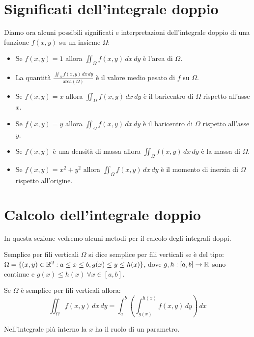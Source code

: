\section{Significati dell'integrale doppio}
Diamo ora alcuni possibili significati e interpretazioni dell'integrale doppio di una funzione $f(x,y)$ su un insieme $\Omega$:

\begin{itemize}
  \item Se $f(x,y)=1$ allora $\iint_{\Omega} f(x,y) \, dx \, dy$ è l'area di $\Omega$.
  \item La quantità $\frac{\iint_{\Omega} f(x,y) \, dx \, dy}{\text{area}(\Omega)}$ è il valore medio pesato di $f$ su $\Omega$.
  \item Se $f(x,y)=x$ allora $\iint_{\Omega} f(x,y) \, dx \, dy$ è il baricentro di $\Omega$ rispetto all'asse $x$.
  \item Se $f(x,y)=y$ allora $\iint_{\Omega} f(x,y) \, dx \, dy$ è il baricentro di $\Omega$ rispetto all'asse $y$.
  \item Se $f(x,y)$ è una densità di massa allora $\iint_{\Omega} f(x,y) \, dx \, dy$ è la massa di $\Omega$.
  \item Se $f(x,y)=x^2+y^2$ allora $\iint_{\Omega} f(x,y) \, dx \, dy$ è il momento di inerzia di $\Omega$ rispetto all'origine.
\end{itemize}

\section{Calcolo dell'integrale doppio}
In questa sezione vedremo alcuni metodi per il calcolo degli integrali doppi.\\

\begin{definizione}{Semplice per fili verticali}
  $\Omega$ si dice semplice per fili verticali se è del tipo: $\Omega = \{ (x,y) \in \mathbb{R}^2 : a \leq x \leq b, g(x) \leq y \leq h(x) \}$, dove $g,h:[a,b] \rightarrow \mathbb{R}$ sono continue e $g(x) \leq h(x) \ \forall x \in [a,b]$.
\end{definizione}

Se $\Omega$ è semplice per fili verticali allora:
\[
\iint_{\Omega} f(x,y) \, dx \, dy = \int_{a}^{b} \left( \int_{g(x)}^{h(x)} f(x,y) \, dy \right) \, dx
\]

\begin{osservazione}{}
  Nell'integrale più interno la $x$ ha il ruolo di un parametro.
\end{osservazione}

